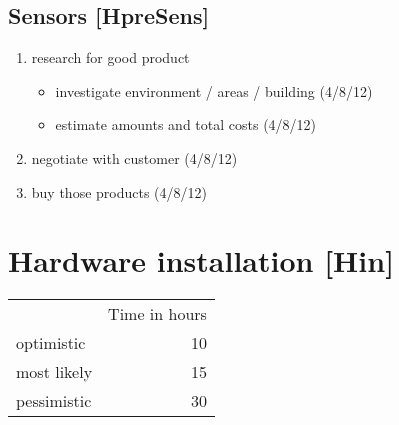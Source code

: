 \documentclass
[
 12pt, %
       DIV12,
       a4paper, %
       oneside, %
       titlepage, %
       parskip=half, %
       headings=normal, %
       listof=totoc, %
       bibliography=totoc, %
       index=totoc, %
       captions=tableheading, %
       ]{scrreprt}
\begin{document}
\section{Sensors [HpreSens]}
\label{sec:org6352bec}

\begin{enumerate}
\item research for good product
\begin{itemize}
\item investigate environment / areas / building (4/8/12)
\item estimate amounts and total costs (4/8/12)
\end{itemize}
\item negotiate with customer (4/8/12)
\item buy those products (4/8/12)
\end{enumerate}



\chapter{Hardware installation [Hin]}
\label{sec:org2cae8f9}

\begin{center}
\begin{tabular}{lr}
 & Time in hours\\
optimistic & 10\\
most likely & 15\\
pessimistic & 30\\
\end{tabular}
\end{center}
\end{document}
